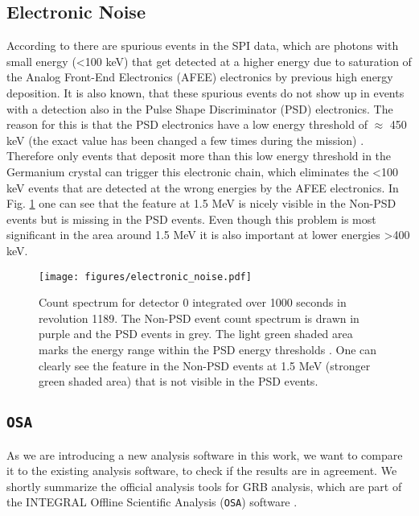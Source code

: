 \documentclass[twocolumn]{aa}
\begin{document}
\subsection{Electronic Noise}
\label{electronic}
According to \citet{spi_electronic_noise} there are spurious events in the SPI data, which are photons with small energy (<100 keV) that get detected at a higher energy due to saturation of the Analog Front-End Electronics (AFEE) electronics by previous high energy deposition. It is also known, that these spurious events do not show up in events with a detection also in the Pulse Shape Discriminator (PSD) electronics. The reason for this is that the PSD electronics have a low energy threshold of $\approx$ 450 keV (the exact value has been changed a few times during the mission) \citep{spi_electronic_noise}. Therefore only events that deposit more than this low energy threshold in the Germanium crystal can trigger this electronic chain, which eliminates the <100 keV events that are detected at the wrong energies by the AFEE electronics. In Fig. \ref{fig:electronic} one can see that the feature at 1.5 MeV is nicely visible in the Non-PSD events but is missing in the PSD events. Even though this problem is most significant in the area around 1.5 MeV it is also important at lower energies >400 keV.

\begin{figure}
    \begin{centering}
        \texttt{[image: figures/electronic\_noise.pdf]}
        \caption{Count spectrum for detector 0 integrated over 1000 seconds in revolution 1189. The Non-PSD event count spectrum is drawn in purple and the PSD events in grey. The light green shaded area marks the energy range within the PSD energy thresholds \citep{spi_electronic_noise}. One can clearly see the feature in the Non-PSD events at 1.5 MeV (stronger green shaded area) that is not visible in the PSD events.}
        \label{fig:electronic}
    \end{centering}
\end{figure}

\subsection{{\tt OSA}}
\label{{\tt OSA}}

As we are introducing a new analysis software in this work, we want to compare it to the existing analysis software, to check if the results are in agreement. We shortly summarize the official analysis tools for GRB analysis, which are part of the INTEGRAL Offline Scientific Analysis ({\tt OSA}) software \citep{osa}.
\end{document}
